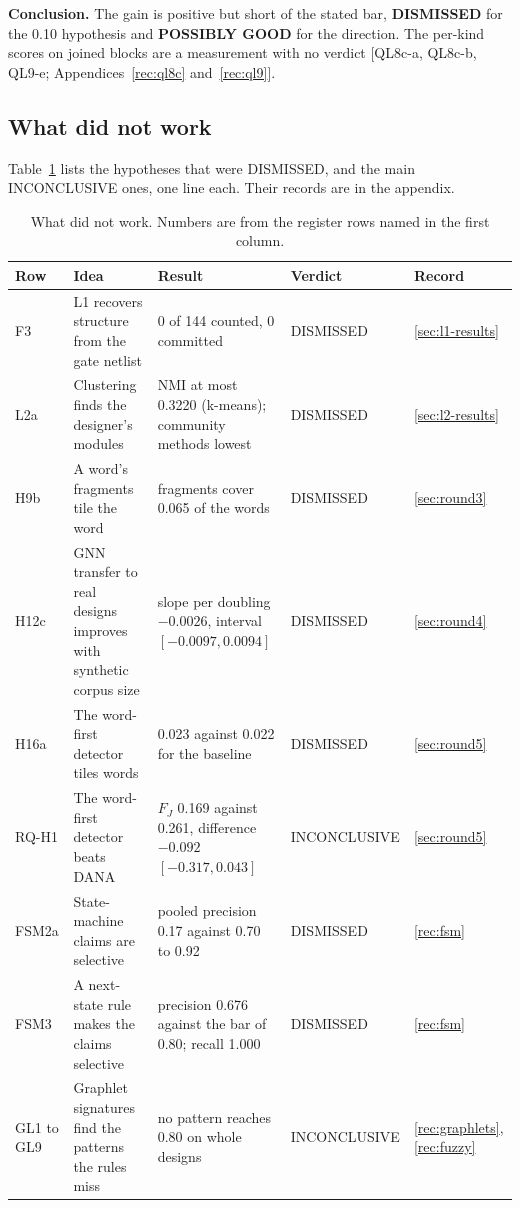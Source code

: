 \documentclass[conference]{IEEEtran}
\newcommand{\verdict}[1]{\textbf{\textsc{#1}}}
\newcommand{\hev}[1]{\par\smallskip\noindent\textbf{#1}}
\begin{document}
\hev{Conclusion.} The gain is positive but short of the stated bar, \verdict{DISMISSED} for the 0.10 hypothesis and \verdict{POSSIBLY GOOD} for the direction. The per-kind scores on joined blocks are a measurement with no verdict [QL8c-a, QL8c-b, QL9-e; Appendices~\ref{rec:ql8c} and~\ref{rec:ql9}].

\subsection{What did not work}

Table~\ref{tab:notwork} lists the hypotheses that were DISMISSED, and the main INCONCLUSIVE ones, one
line each. Their records are in the appendix.
\begin{table}[t]
\caption{What did not work. Numbers are from the register rows named in the first column.}
\label{tab:notwork}
\centering
\footnotesize
\begin{tabular}{@{}p{}p{}p{}p{}p{}@{}}
\toprule
Row & Idea & Result & Verdict & Record \\
\midrule
F3 & L1 recovers structure from the gate netlist & 0 of 144 counted, 0 committed & DISMISSED & \ref{sec:l1-results} \\
L2a & Clustering finds the designer's modules & NMI at most 0.3220 (k-means); community methods lowest & DISMISSED & \ref{sec:l2-results} \\
H9b & A word's fragments tile the word & fragments cover 0.065 of the words & DISMISSED & \ref{sec:round3} \\
H12c & GNN transfer to real designs improves with synthetic corpus size & slope per doubling $-0.0026$, interval $[-0.0097, 0.0094]$ & DISMISSED & \ref{sec:round4} \\
H16a & The word-first detector tiles words & 0.023 against 0.022 for the baseline & DISMISSED & \ref{sec:round5} \\
RQ-H1 & The word-first detector beats DANA & $F_J$ 0.169 against 0.261, difference $-0.092$ $[-0.317, 0.043]$ & INCONCLUSIVE & \ref{sec:round5} \\
FSM2a & State-machine claims are selective & pooled precision 0.17 against 0.70 to 0.92 & DISMISSED & \ref{rec:fsm} \\
FSM3 & A next-state rule makes the claims selective & precision 0.676 against the bar of 0.80; recall 1.000 & DISMISSED & \ref{rec:fsm} \\
GL1 to GL9 & Graphlet signatures find the patterns the rules miss & no pattern reaches 0.80 on whole designs & INCONCLUSIVE & \ref{rec:graphlets}, \ref{rec:fuzzy} \\

\end{tabular}
\end{table}
\end{document}

